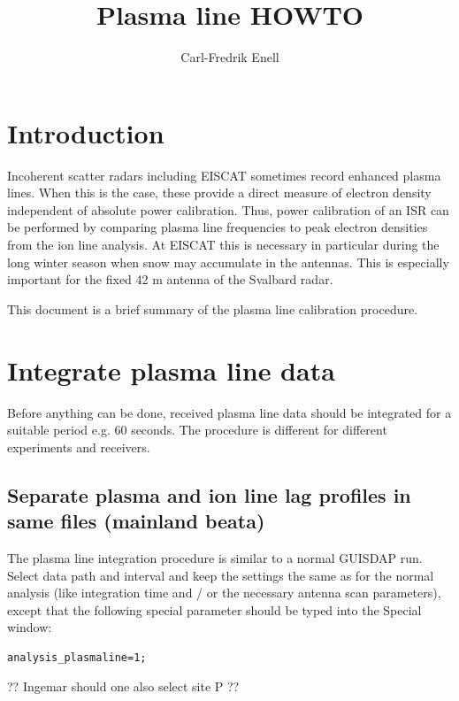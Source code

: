\documentclass[a4]{article}
\title{Plasma line HOWTO}
\author{Carl-Fredrik Enell}
\begin{document}
\pagestyle{empty}

\maketitle{}
\thispagestyle{empty}

\section{Introduction}
\label{sec:introduction}

Incoherent scatter radars including EISCAT sometimes record enhanced
plasma lines. When this is the case, these provide a direct measure of
electron density independent of absolute power calibration.  Thus,
power calibration of an ISR can be performed by comparing plasma line
frequencies to peak electron densities from the ion line analysis.  At
EISCAT this is necessary in particular during the long winter season
when snow may accumulate in the antennas. This is especially important
for the fixed 42 m antenna of the Svalbard radar.

This document is a brief summary of the plasma line calibration procedure.



\section{Integrate plasma line data}
\label{sec:integr-plasma-line}

Before anything can be done, received plasma line data should be
integrated for a suitable period e.g. 60 seconds. The procedure is
different for different experiments and receivers.


\subsection{Separate plasma and ion line lag profiles in same files (mainland beata)}
\label{sec:plasma-ion-lines}

The plasma line integration procedure is similar to a normal GUISDAP
run. Select data path and interval and keep the settings the same as
for the normal analysis (like integration time and / or the necessary antenna scan parameters),
except that the following special parameter
should be typed into the Special window:

\begin{verbatim}
analysis_plasmaline=1;
\end{verbatim}
?? Ingemar should one also select site P ??
\end{document}
